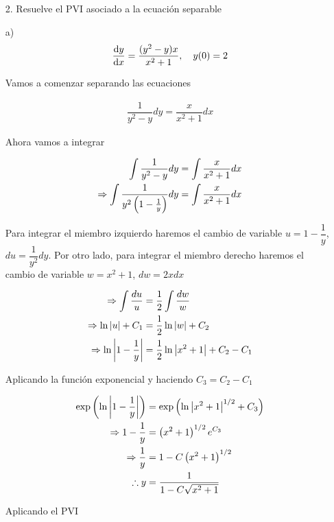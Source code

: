 \begin{enumerate}
    \item[2.] Resuelve el PVI asociado a la ecuación separable
\end{enumerate}

\begin{enumerate}
   
      \item[a)] 
\begin{align*}
    \dv{y}{x}= \frac{(y^{2}-y)x}{x^{2}+1}, \quad y(0)=2
\end{align*}

Vamos a comenzar separando las ecuaciones 

\begin{align*}
    \dfrac{1}{y^2-y}dy=\dfrac{x}{x^2+1}dx
\end{align*}

Ahora vamos a integrar

\begin{align*}
    \int \dfrac{1}{y^2-y}dy&=\int\dfrac{x}{x^2+1}dx\\
    \Rightarrow \int\dfrac{1}{y^2\left( 1-\frac{1}{y} \right)}dy&=\int\dfrac{x}{x^2+1}dx
\end{align*}

Para integrar el miembro izquierdo haremos el cambio de variable $u=1-\dfrac{1}{y}$, $du=\dfrac{1}{y^2}dy$. Por otro lado, para integrar el miembro derecho haremos el cambio de variable $w=x^2+1$, $dw=2xdx$

 \begin{align*}
 \Rightarrow \int\dfrac{du}{u} &= \dfrac{1}{2}\int \dfrac{dw}{w}\\
 \Rightarrow \ln \left| u \right| + C_1 &= \dfrac{1}{2}\ln \left| w \right| + C_2 \\
 \Rightarrow \ln \left| 1-\dfrac{1}{y} \right| &= \dfrac{1}{2} \ln \left| x^2+1 \right| + C_2-C_1 
 \end{align*}
 
 Aplicando la función exponencial y haciendo $C_3=C_2-C_1$
 
 \begin{align*}
     \exp\left( \ln\left| 1-\dfrac{1}{y} \right| \right)&=\exp\left( \ln\left| x^2+1 \right|^{1/2}+C_3 \right) \\
     \Rightarrow 1-\dfrac{1}{y}&= \left( x^2+1 \right)^{1/2}e^{C_3} \\
     \Rightarrow  \dfrac{1}{y} &= 1-C\left( x^2+1 \right)^{1/2} \\
     \therefore y &= \dfrac{1}{1-C\sqrt{x^2+1}}
 \end{align*}
 
 Aplicando el PVI 
 

\end{enumerate}
